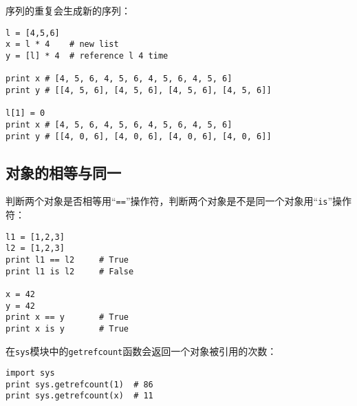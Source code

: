 序列的重复会生成新的序列：

\begin{lstlisting}
l = [4,5,6]
x = l * 4    # new list
y = [l] * 4  # reference l 4 time

print x # [4, 5, 6, 4, 5, 6, 4, 5, 6, 4, 5, 6]
print y # [[4, 5, 6], [4, 5, 6], [4, 5, 6], [4, 5, 6]]

l[1] = 0
print x # [4, 5, 6, 4, 5, 6, 4, 5, 6, 4, 5, 6]
print y # [[4, 0, 6], [4, 0, 6], [4, 0, 6], [4, 0, 6]]
\end{lstlisting}

\subsection{对象的相等与同一}

判断两个对象是否相等用“\verb|==|”操作符，判断两个对象是不是同一个对象用“\verb|is|”操作符：

\begin{lstlisting}
l1 = [1,2,3]
l2 = [1,2,3]
print l1 == l2     # True
print l1 is l2     # False

x = 42
y = 42
print x == y       # True
print x is y       # True
\end{lstlisting}

在\verb|sys|模块中的\verb|getrefcount|函数会返回一个对象被引用的次数：

\begin{lstlisting}
import sys
print sys.getrefcount(1)  # 86
print sys.getrefcount(x)  # 11
\end{lstlisting}
